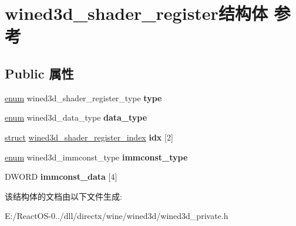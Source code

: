 \hypertarget{structwined3d__shader__register}{}\section{wined3d\+\_\+shader\+\_\+register结构体 参考}
\label{structwined3d__shader__register}
\subsection*{Public 属性}
\begin{DoxyCompactItemize}
\item 
\mbox{\label{structwined3d__shader__register_a9649135e9cbd7920c7fb2432defa6e93}} 
\hyperlink{interfaceenum}{enum} wined3d\+\_\+shader\+\_\+register\+\_\+type {\bfseries type}
\item 
\mbox{\label{structwined3d__shader__register_adbfe0b0e43ae57bc9eb2920b27d426f5}} 
\hyperlink{interfaceenum}{enum} wined3d\+\_\+data\+\_\+type {\bfseries data\+\_\+type}
\item 
\mbox{\label{structwined3d__shader__register_ab93408608b19b67fa5045264f99c247a}} 
\hyperlink{interfacestruct}{struct} \hyperlink{structwined3d__shader__register__index}{wined3d\+\_\+shader\+\_\+register\+\_\+index} {\bfseries idx} \mbox{[}2\mbox{]}
\item 
\mbox{\label{structwined3d__shader__register_ae99c9bd7ae0cdb2d41292dafe672cdfc}} 
\hyperlink{interfaceenum}{enum} wined3d\+\_\+immconst\+\_\+type {\bfseries immconst\+\_\+type}
\item 
\mbox{\label{structwined3d__shader__register_aec07263b7a886fd78475b369e13f2a45}} 
D\+W\+O\+RD {\bfseries immconst\+\_\+data} \mbox{[}4\mbox{]}
\end{DoxyCompactItemize}


该结构体的文档由以下文件生成\+:\begin{DoxyCompactItemize}
\item 
E\+:/\+React\+O\+S-\/0../dll/directx/wine/wined3d/wined3d\+\_\+private.\+h\end{DoxyCompactItemize}
